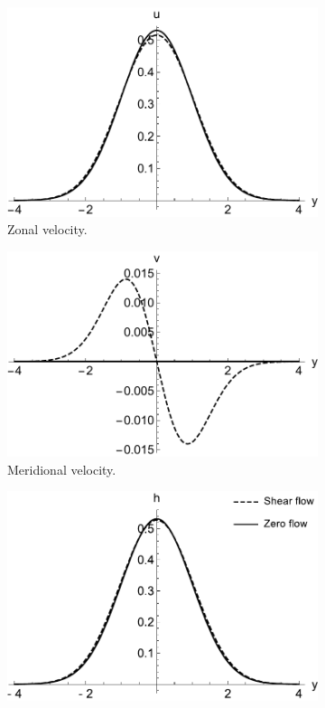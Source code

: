 \begin{figure}
  \begin{subfigure}[b]{0.32\textwidth}
    \includegraphics[width=\textwidth]{figures/wave-mean-flow/free-u-shear-kelvin.pdf}
    \caption{Zonal velocity.}
    \label{fig:free-u-shear-kelvin}
  \end{subfigure}
  \begin{subfigure}[b]{0.32\textwidth}
    \includegraphics[width=\textwidth]{figures/wave-mean-flow/free-v-shear-kelvin.pdf}
    \caption{Meridional velocity.}
    \label{fig:free-v-shear-kelvin}
  \end{subfigure}
  \begin{subfigure}[b]{0.32\textwidth}
    \includegraphics[width=\textwidth]{figures/wave-mean-flow/free-h-shear-kelvin.pdf}

\end{subfigure}
\end{figure}

